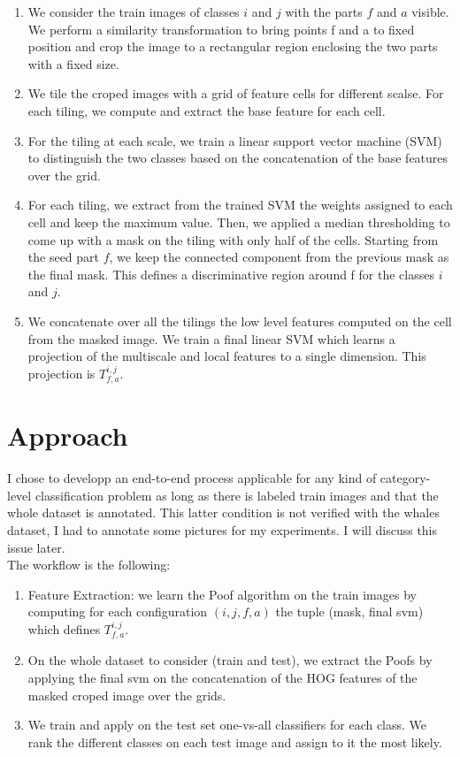 \documentclass[twoside]{article}
\begin{document}
\begin{multicols}{2}
\begin{enumerate}
	\item We consider the train images of classes $i$ and $j$ with the parts $f$ and $a$ visible. We perform a similarity transformation to bring points f and a to fixed position and crop the image to a rectangular region enclosing the two parts with a fixed size.
	\item We tile the croped images with a grid of feature cells for different scalse. For each tiling, we compute and extract the base feature for each cell.
	\item For the tiling at each scale, we train a linear support vector machine (SVM) to distinguish the two classes based on the concatenation of the base features over the grid.
	\item For each tiling, we extract from the trained SVM the weights assigned to each cell and keep the maximum value. Then, we applied a median thresholding to come up with a mask on the tiling with only half of the cells. Starting from the seed part $f$, we keep the connected component from the previous mask as the final mask. This defines a discriminative region around f for the classes $i$ and $j$.
	\item We concatenate over all the tilings the low level features computed on the cell from the masked image. We train a final linear SVM which learns a projection of the multiscale and local features to a single dimension. This projection is $T^{i,j}_{f,a}$.
\end{enumerate}

\section{Approach}

I chose to developp an end-to-end process applicable for any kind of category-level classification problem as long as there is labeled train images and that the whole dataset is annotated. This latter condition is not verified with the whales dataset, I had to annotate some pictures for my experiments. I will discuss this issue later.\\

The workflow is the following:
\begin{enumerate}
	\item Feature Extraction: we learn the Poof algorithm on the train images by computing for each configuration $(i, j, f, a)$ the tuple (mask, final svm) which defines $T^{i,j}_{f,a}$.
	\item On the whole dataset to consider (train and test), we extract the Poofs by applying the final svm on the concatenation of the HOG features of the masked croped image over the grids.
	\item We  train and apply on the test set one-vs-all classifiers for each class. We rank the different classes on each test image and assign to it the most likely.
\end{enumerate}


\end{multicols}
\end{document}
